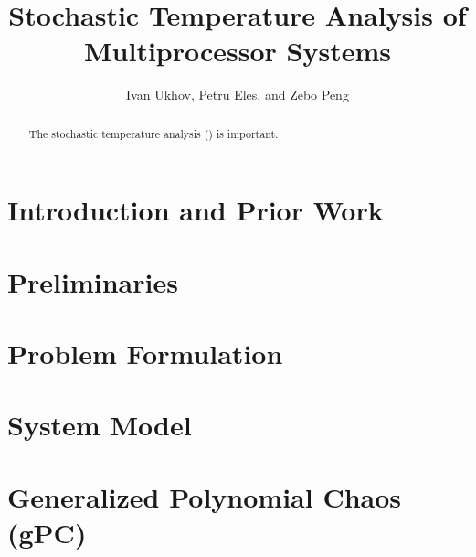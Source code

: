 \documentclass[conference]{IEEEtran}
\begin{document}
  \title{Stochastic Temperature Analysis of\\Multiprocessor Systems}
  \author{Ivan Ukhov, Petru Eles, and Zebo Peng}

  \author{
    \and
    \and
  }

  \maketitle

  \begin{abstract}
    The stochastic temperature analysis (\sta) is important.
  \end{abstract}

  \section{Introduction and Prior Work} 
  

  \section{Preliminaries}
  

  \section{Problem Formulation}
  

  \section{System Model}
  

  \section{Generalized Polynomial Chaos (gPC)}
  

  
  
\end{document}
